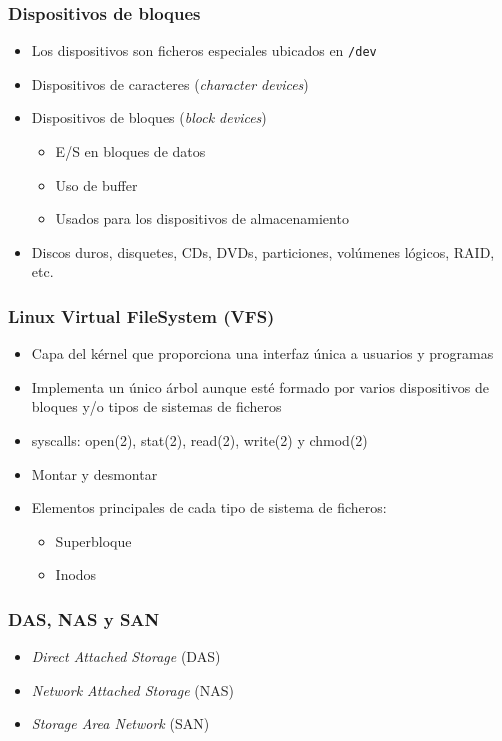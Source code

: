 \documentclass[aspectratio=169]{beamer}
\begin{document}
\begin{frame}
  \frametitle{Dispositivos de bloques}
  \begin{itemize}
    \item Los dispositivos son ficheros especiales ubicados en
      \texttt{/dev}
    \item Dispositivos de caracteres (\textit{character devices})
    \item Dispositivos de bloques (\textit{block devices})
      \begin{itemize}
      \item E/S en bloques de datos
      \item Uso de buffer
      \item Usados para los dispositivos de almacenamiento
      \end{itemize}
    \item Discos duros, disquetes, CDs, DVDs, particiones, volúmenes
      lógicos, RAID, etc.
  \end{itemize}
\end{frame}

\begin{frame}
  \frametitle{Linux Virtual FileSystem (VFS)}
  \begin{itemize}
  \item Capa del kérnel que proporciona una interfaz única a usuarios
    y programas
  \item Implementa un único árbol aunque esté formado por varios
    dispositivos de bloques y/o tipos de sistemas de ficheros
  \item syscalls: open(2), stat(2), read(2), write(2) y chmod(2)
  \item Montar y desmontar
  \item Elementos principales de cada tipo de sistema de ficheros:
    \begin{itemize}
    \item Superbloque
    \item Inodos
    \end{itemize}
  \end{itemize}
\end{frame}

\begin{frame}
  \frametitle{DAS, NAS y SAN}
  \begin{itemize}
  \item \textit{Direct Attached Storage} (DAS)
  \item \textit{Network Attached Storage} (NAS)
  \item \textit{Storage Area Network} (SAN)
  \end{itemize}
\end{frame}
\end{document}
